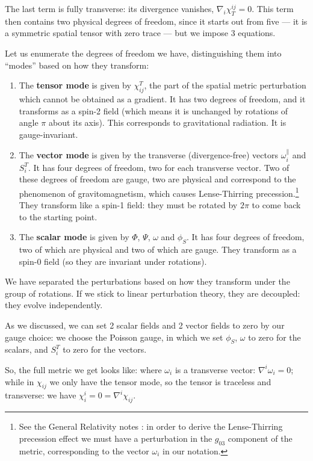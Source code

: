 \documentclass[main.tex]{subfiles}
\begin{document}
The last term is fully transverse: its divergence vanishes, \(\nabla_{i} \chi^{ij}_{T} = 0\).  This term then contains two physical degrees of freedom, since it starts out from five --- it is a symmetric spatial tensor with zero trace --- but we impose 3 equations.

Let us enumerate the degrees of freedom we have, distinguishing them into ``modes'' based on how they transform:
\begin{enumerate}
  \item The \textbf{tensor mode} is given by \(\chi^{T}_{ij}\), the part of the spatial metric perturbation which cannot be obtained as a gradient. It has two degrees of freedom, and it transforms as a spin-2 field (which means it is unchanged by rotations of angle \(\pi \) about its axis). This corresponds to gravitational radiation. It is gauge-invariant.
  \item The \textbf{vector mode} is given by the transverse (divergence-free) vectors \(\omega_{i}^{\parallel}\) and \(S^{T}_{i}\). It has four degrees of freedom, two for each transverse vector. Two of these degrees of freedom are gauge, two are physical and correspond to the phenomenon of gravitomagnetism, which causes Lense-Thirring precession.\footnote{See the General Relativity notes \cite[equation 341]{tissinoGeneralRelativityNotes2020}: in order to derive the Lense-Thirring precession effect we must have a perturbation in the \(g_{03} \) component of the metric, corresponding to the vector \(\omega_{i}\) in our notation.} They transform like a spin-1 field: they must be rotated by \(2 \pi \) to come back to the starting point.
  \item The \textbf{scalar mode} is given by \(\Phi \), \(\Psi \), \(\omega\) and \(\phi_{S}\). It has four degrees of freedom, two of which are physical and two of which are gauge. They transform as a spin-0 field (so they are invariant under rotations). 
\end{enumerate}

We have separated the perturbations based on how they transform under the group of rotations. 
If we stick to linear perturbation theory, they are decoupled: they evolve independently. 

As we discussed, we can set 2 scalar fields and 2 vector fields to zero by our gauge choice: we choose the Poisson gauge, in which we set \(\phi_{S}\), \(\omega \) to zero for the scalars, and \(S_{i}^{T}\) to zero for the vectors. 

So, the full metric we get looks like:
%
%
where \(\omega_{i}\) is a transverse vector: \(\nabla^{i} \omega_{i} = 0\); while in \(\chi_{ij}\) we only have the tensor mode, so the tensor is traceless and transverse: we have \(\chi^{i}_{i} = 0 = \nabla^{i} \chi_{ij} \). 
\end{document}
